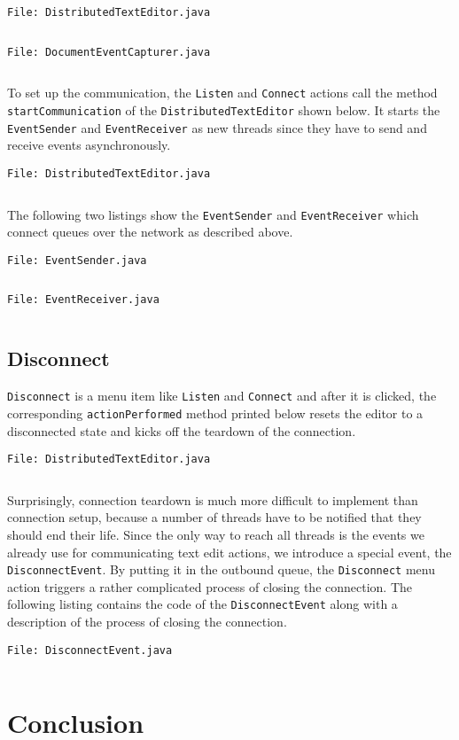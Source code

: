 \documentclass[a4paper,draft,12pt,oneside,article,table]{memoir}
\newcommand{\srcpath}{../ex09/src/main/java/ddist}
\newcommand{\inmnt}[3]{\vspace{1em}\noindent\texttt{\color{gray}File: #3}\vspace{-1em}\inputminted[tabsize=4,firstline=#1,firstnumber=#1,lastline=#2,linenos]{java}{\srcpath/#3}}
\newcommand{\mil}[1]{\texttt{#1}}
\begin{document}
\inmnt{43}{67}{DistributedTextEditor.java}

\inmnt{30}{39}{DocumentEventCapturer.java}

To set up the communication, the \mil{Listen} and \mil{Connect} actions
call the method \mil{startCommunication} of the
\mil{DistributedTextEditor} shown below. It starts the \mil{EventSender}
and \mil{EventReceiver} as new threads since they have to send and
receive events asynchronously.

\inmnt{300}{318}{DistributedTextEditor.java}

The following two listings show the \mil{EventSender} and
\mil{EventReceiver} which connect queues over the network as described
above.

\inmnt{1}{1000}{EventSender.java}

\inmnt{1}{1000}{EventReceiver.java}

\section{Disconnect}

\mil{Disconnect} is a menu item like \mil{Listen} and \mil{Connect} and
after it is clicked, the corresponding \mil{actionPerformed} method
printed below resets the editor to a disconnected state and kicks off
the teardown of the connection.

\inmnt{230}{240}{DistributedTextEditor.java}

Surprisingly, connection teardown is much more difficult to implement
than connection setup, because a number of threads have to be notified
that they should end their life. Since the only way to reach all threads
is the events we already use for communicating text edit actions, we
introduce a special event, the \mil{DisconnectEvent}. By putting it in
the outbound queue, the \mil{Disconnect} menu action triggers a rather
complicated process of closing the connection. The following listing
contains the code of the \mil{DisconnectEvent} along with a description
of the process of closing the connection.

\inmnt{1}{1000}{DisconnectEvent.java}


\chapter{Conclusion}
\end{document}
